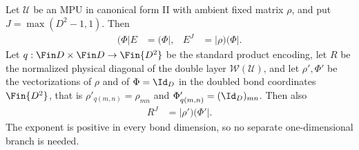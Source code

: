 \begin{lemma}
    \label{thm:mpu_canonical_form_ii_transfer_stabilization}
    \leanok
    Let $\mathcal U$ be an MPU in canonical form II with ambient fixed
    matrix $\rho$, and put $J=\max(D^2-1,1)$. Then
    \begin{align}
        (\Phi\rvert E & =(\Phi\rvert,
                      & E^J           & =\lvert\rho)(\Phi\rvert.
        \label{eq:mpu_ambient_cfii_stabilization}
    \end{align}
    Let $q:\Fin D\times\Fin D\to\Fin{D^2}$ be the standard product encoding,
    let $R$ be the normalized physical diagonal of the double layer
    $\mathcal W(\mathcal U)$, and let $\rho',\Phi'$ be the vectorizations of
    $\rho$ and of $\Phi=\Id_D$ in the doubled bond coordinates $\Fin{D^2}$,
    that is $\rho'_{q(m,n)}=\rho_{mn}$ and $\Phi'_{q(m,n)}=(\Id_D)_{mn}$. Then
    also
    \begin{align}
        R^J & =\lvert\rho')(\Phi'\rvert.
        \label{eq:mpu_ambient_cfii_double_layer}
    \end{align}
    The exponent is positive in every bond dimension, so no separate
    one-dimensional branch is needed.
\end{lemma}

